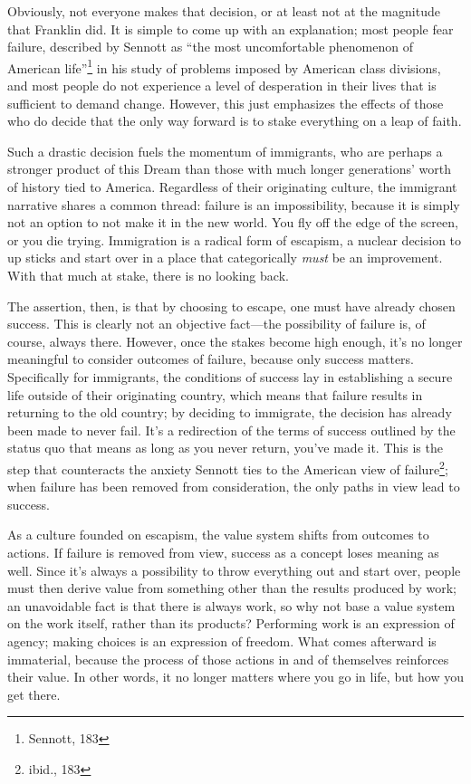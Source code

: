 Obviously, not everyone makes that decision, or at least not at the magnitude
that Franklin did. It is simple to come up with an explanation; most people fear
failure, described by Sennott as ``the most uncomfortable phenomenon of
American life''\footnote{Sennott, 183} in his study of problems imposed by
American class divisions, and most people do not experience a level of
desperation in their lives that is sufficient to demand change.  However, this
just emphasizes the effects of those who do decide that the only way forward is
to stake everything on a leap of faith.

Such a drastic decision fuels the momentum of immigrants, who are perhaps a
stronger product of this Dream than those with much longer generations' worth of
history tied to America. Regardless of their originating culture, the immigrant
narrative shares a common thread: failure is an impossibility, because it is
simply not an option to not make it in the new world. You fly off the edge of
the screen, or you die trying. Immigration is a radical form of escapism, a
nuclear decision to up sticks and start over in a place that categorically
\textit{must} be an improvement. With that much at stake, there is no looking
back.

The assertion, then, is that by choosing to escape, one must have already chosen
success. This is clearly not an objective fact---the possibility of failure is,
of course, always there. However, once the stakes become high enough, it's no
longer meaningful to consider outcomes of failure, because only success matters.
Specifically for immigrants, the conditions of success lay in establishing a
secure life outside of their originating country, which means that failure
results in returning to the old country; by deciding to immigrate, the decision
has already been made to never fail. It's a redirection of the terms of success
outlined by the status quo that means as long as you never return, you've made
it. This is the step that counteracts the anxiety Sennott ties to the American
view of failure\footnote{ibid., 183}; when failure has been removed from
consideration, the only paths in view lead to success.

As a culture founded on escapism, the value system shifts from outcomes to
actions. If failure is removed from view, success as a concept loses meaning as
well. Since it's always a possibility to throw everything out and start over,
people must then derive value from something other than the results produced by
work; an unavoidable fact is that there is always work, so why not base a value
system on the work itself, rather than its products? Performing work is an
expression of agency; making choices is an expression of freedom.
What comes afterward is immaterial, because the process of those actions in and
of themselves reinforces their value. In other words, it no longer matters where
you go in life, but how you get there.

